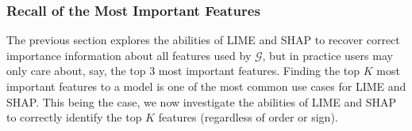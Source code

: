 \documentclass[11pt]{article}    %
\begin{document}

            
                    \subsubsection{Recall of the Most Important Features}
                        The previous section explores the abilities of LIME and SHAP to recover correct importance information about all features used by $\mathcal{G}$, but in practice  users may only care about, say, the top 3 most important features. Finding the top $K$ most important features to a model is one of the most common use cases for LIME and SHAP. This being the case, we now investigate the abilities of LIME and SHAP to correctly identify the top $K$ features (regardless of order or sign). 
                        
\end{document}
